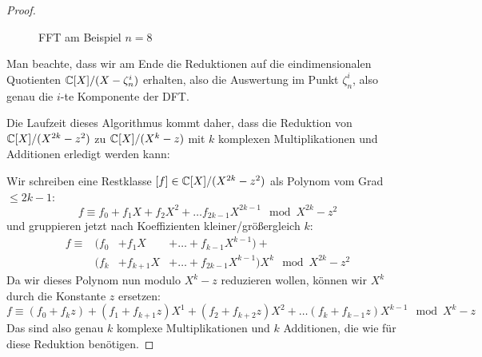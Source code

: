 \begin{proof}
    \begin{figure}[hpt]
        \caption{FFT am Beispiel $n=8$}
        \label{fig:fft:example_n_equals_8}
    \end{figure}

    Man beachte, dass wir am Ende die Reduktionen auf die eindimensionalen Quotienten $\mathbb{C}[X]/(X - \zeta_n^i)$ erhalten, also die Auswertung im Punkt $\zeta_n^i$, also genau die $i$-te Komponente der DFT\@.

    \medskip
    Die Laufzeit dieses Algorithmus kommt daher, dass die Reduktion von $\mathbb{C}[X]/(X^{2k}-z^2)$ zu $\mathbb{C}[X]/(X^k-z)$ mit $k$ komplexen Multiplikationen und Additionen erledigt werden kann:

    Wir schreiben eine Restklasse $[f] \in \mathbb{C}[X]/(X^{2k}-z^2)$ als Polynom vom Grad $\leq 2k-1$:
    \[f \equiv f_0 + f_1 X + f_2 X^2 + \ldots f_{2k-1}X^{2k-1} \mod X^{2k}-z^2\]
    und gruppieren jetzt nach Koeffizienten kleiner/größergleich $k$:
    \begin{align*}
        f \equiv & (f_0     &+ f_1 X      &+ \ldots + f_{k-1}X^{k-1}) + \\
        & (f_k &+ f_{k+1}X &+ \ldots + f_{2k-1}X^{k-1})X^k \mod X^{2k}-z^2
    \end{align*}
    Da wir dieses Polynom nun modulo $X^k-z$ reduzieren wollen, können wir $X^k$ durch die Konstante $z$ ersetzen:
    \[f \equiv (f_0+f_k z) + (f_1+f_{k+1}z)X^1+(f_2+f_{k+2}z)X^2 + \ldots (f_{k}+f_{k-1}z)X^{k-1} \mod X^k-z\]
    Das sind also genau $k$ komplexe Multiplikationen und $k$ Additionen, die wie für diese Reduktion benötigen.


\end{proof}
